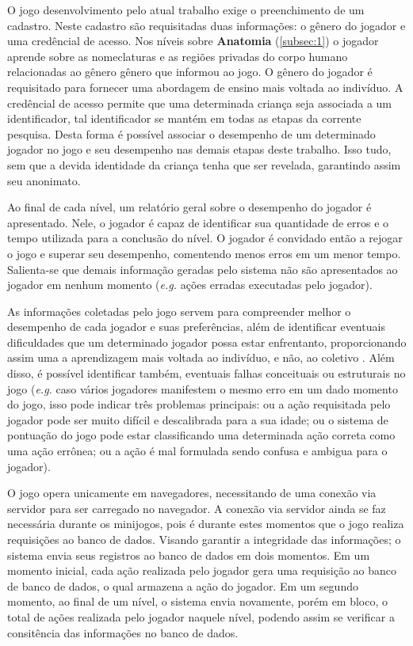 O jogo desenvolvimento pelo atual trabalho exige o preenchimento de um cadastro. Neste cadastro são requisitadas duas informações: o gênero do jogador e uma credêncial de acesso. Nos níveis sobre \textbf{Anatomia} (\autoref{subsec:1}) o jogador aprende sobre as nomeclaturas e as regiões privadas do corpo humano relacionadas ao gênero gênero que informou ao jogo. O gênero do jogador é requisitado para fornecer uma abordagem de ensino mais voltada ao indivíduo. A credêncial de acesso permite que uma determinada criança seja associada a um identificador, tal identificador se mantém em todas as etapas da corrente pesquisa. Desta forma é possível associar o desempenho de um determinado jogador no jogo e seu desempenho nas demais etapas deste trabalho. Isso tudo, sem que a devida identidade da criança tenha que ser revelada, garantindo assim seu anonimato. 

Ao final de cada nível, um relatório geral sobre o desempenho do jogador é apresentado. Nele, o jogador é capaz de identificar sua quantidade de erros e o tempo utilizada para a conclusão do nível. O jogador é convidado então a rejogar o jogo e superar seu desempenho, comentendo menos erros em um menor tempo. Salienta-se que demais informação geradas pelo sistema não são apresentados ao jogador em nenhum momento (\textit{e.g.} ações erradas executadas pelo jogador). 

As informações coletadas pelo jogo servem para compreender melhor o desempenho de cada jogador e suas preferências, além de identificar eventuais dificuldades que um determinado jogador possa estar enfrentanto, proporcionando assim uma a aprendizagem mais voltada ao indivíduo, e não, ao coletivo \cite{carrara2018criancca}. Além disso, é possível identificar também, eventuais falhas conceituais ou estruturais no jogo (\textit{e.g.} caso vários jogadores manifestem o mesmo erro em um dado momento do jogo, isso pode indicar três problemas principais: ou a ação requisitada pelo jogador pode ser muito difícil e descalibrada para a sua idade; ou o sistema de pontuação do jogo pode estar classificando uma determinada ação correta como uma ação errônea; ou a ação é mal formulada sendo confusa e ambigua para o jogador).

O jogo opera unicamente em navegadores, necessitando de uma conexão via servidor para ser carregado no navegador. A conexão via servidor ainda se faz necessária durante os minijogos, pois é durante estes momentos que o jogo realiza requisições ao banco de dados. Visando garantir a integridade das informações; o sistema envia seus registros ao banco de dados em dois momentos. Em um momento inicial, cada ação realizada pelo jogador gera uma requisição ao banco de banco de dados, o qual armazena a ação do jogador. Em um segundo momento, ao final de um nível, o sistema envia novamente, porém em bloco, o total de ações realizada pelo jogador naquele nível, podendo assim se verificar a consitência das informações no banco de dados. 

